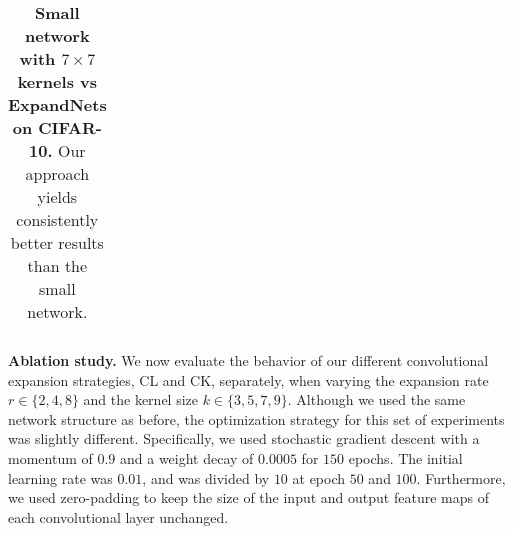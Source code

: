 \documentclass[10pt,twocolumn,letterpaper]{article}
\begin{document}
\begin{table}[!t]
{\begin{tabular}{r c c }
    \bottomrule
    \end{tabular}
    }
    \vspace{0.01cm}
   \caption{\textbf{Small network with $7\times 7$ kernels vs ExpandNets on CIFAR-10.} Our approach yields consistently better results than the small network.}
    \label{table:cifar10_ks_7}
\end{table}\begin{table}[!t]
    \centering
    \vspace{0.01cm}
    \caption{\textbf{Small network with $7\times 7$ kernels vs ExpandNets on CIFAR-100.} Our approach yields consistently better results than the small network.}
    \label{table:cifar100_ks_7}
\end{table}\vspace{0.2cm}\noindent\textbf{Ablation study.}
We now evaluate the behavior of our different convolutional expansion strategies, CL and CK, separately, when varying the expansion rate $r\in \{2, 4, 8\}$ and the kernel size $k \in \{3,5,7,9\}$. Although we used the same network structure as before, the optimization strategy for this set of experiments was slightly different. Specifically, we used stochastic gradient descent with a momentum of $0.9$ and a weight decay of $0.0005$ for $150$ epochs. The initial learning rate was $0.01$, and was divided by $10$ at epoch $50$ and $100$. Furthermore, we used zero-padding to keep the size of the input and output feature maps of each convolutional layer unchanged.
\end{document}
